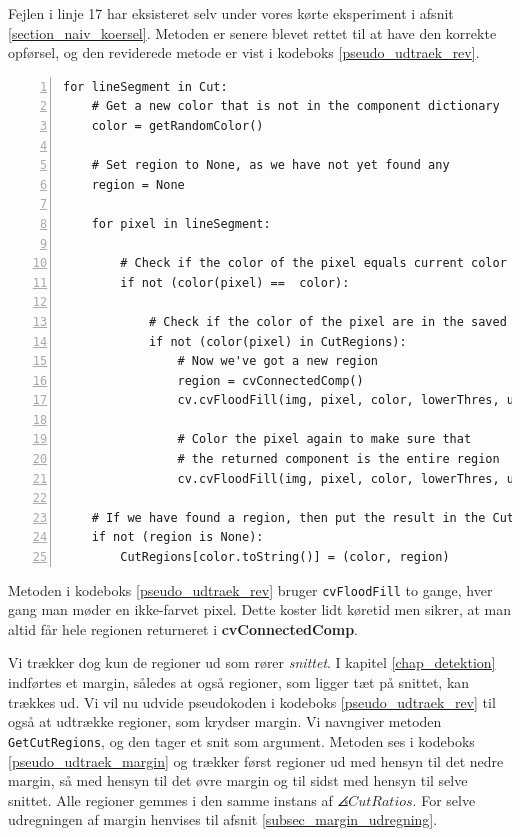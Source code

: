 {Fejlen i linje 17 har eksisteret selv under vores kørte eksperiment i
afsnit \ref{section_naiv_koersel}. Metoden er senere blevet rettet til
at have den korrekte opførsel, og den reviderede metode er vist i
kodeboks \ref{pseudo_udtraek_rev}.

\begin{lstlisting}[caption={Revideret pseudokode til udtrækning af
    regioner. Returnerer ingen
    duplikater.},captionpos=b,label={pseudo_udtraek_rev},numbers=left,
    frame=tb, breaklines=false, float=h]
for lineSegment in Cut:
    # Get a new color that is not in the component dictionary
    color = getRandomColor()

    # Set region to None, as we have not yet found any
    region = None

    for pixel in lineSegment:

        # Check if the color of the pixel equals current color
        if not (color(pixel) ==  color):

            # Check if the color of the pixel are in the saved regions
            if not (color(pixel) in CutRegions):
                # Now we've got a new region
                region = cvConnectedComp()
                cv.cvFloodFill(img, pixel, color, lowerThres, upperThres, region)

                # Color the pixel again to make sure that
                # the returned component is the entire region
                cv.cvFloodFill(img, pixel, color, lowerThres, upperThres, region)

    # If we have found a region, then put the result in the CutRegions-dictionary
    if not (region is None):
        CutRegions[color.toString()] = (color, region)
\end{lstlisting}

Metoden i kodeboks \ref{pseudo_udtraek_rev} bruger \texttt{cvFloodFill}
to gange, hver gang man møder en ikke-farvet pixel. Dette koster lidt
køretid men sikrer, at man altid får hele regionen returneret i
\textbf{cvConnectedComp}.


Vi trækker dog kun de regioner ud som rører \emph{snittet}. I kapitel
\ref{chap_detektion} indførtes et margin, således at også regioner, som
ligger tæt på snittet, kan trækkes ud. Vi vil nu udvide pseudokoden i
kodeboks \ref{pseudo_udtraek_rev} til også at udtrække regioner, som
krydser margin. Vi navngiver metoden \texttt{GetCutRegions}, og den
tager et snit som argument. Metoden ses i kodeboks
\ref{pseudo_udtraek_margin} og trækker først regioner ud med hensyn til
det nedre margin, så med hensyn til det øvre margin og til sidst med
hensyn til selve snittet. Alle regioner gemmes i den samme instans af
$\angles{CutRatios}$. For selve udregningen af margin henvises til
afsnit \ref{subsec_margin_udregning}.

}
